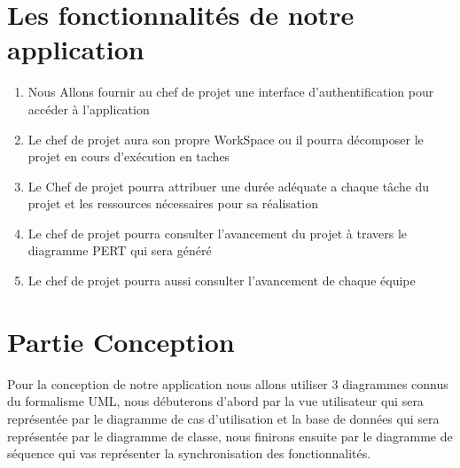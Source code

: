 \documentclass{report}
\begin{document}
\vspace*{\fill}

\newpage
\section{Les fonctionnalités de notre application}

\begin{enumerate}

\item Nous Allons fournir au chef de projet une interface d’authentification pour accéder à l’application
\item  Le chef de projet aura son propre WorkSpace ou il pourra décomposer le projet en cours d’exécution en taches
\item Le Chef de projet pourra attribuer une durée adéquate a chaque tâche du projet et les ressources nécessaires pour sa réalisation
\item Le chef de projet pourra consulter l’avancement du projet à travers le diagramme PERT qui sera généré
\item Le chef de projet pourra aussi consulter l’avancement de chaque équipe

\end{enumerate}

\vspace*{\fill}

\section{Partie Conception}
Pour la conception de notre application nous allons utiliser 3 diagrammes connus du formalisme UML, nous débuterons d’abord par la vue utilisateur qui sera représentée par le diagramme de cas d’utilisation et la base de données qui sera représentée par le diagramme de classe, nous finirons ensuite par le diagramme de séquence qui vas représenter la synchronisation des fonctionnalités.

\vspace*{\fill}
\end{document}
